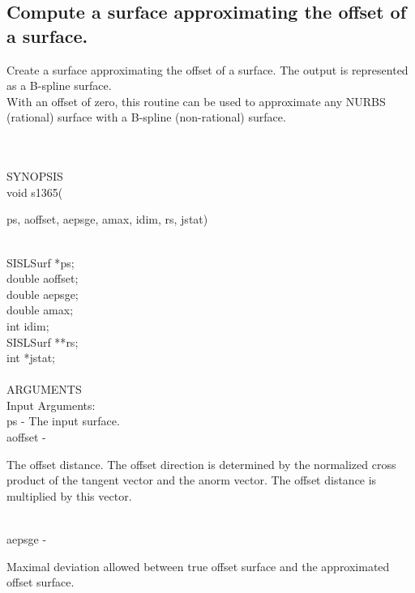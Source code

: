 \subsection{Compute a surface approximating the offset of a surface.}
\begin{minipg1}
  Create a surface approximating the offset of a surface.
  The output is represented as a B-spline surface.\\
  With an offset of zero, this routine can be used to approximate any
  NURBS (rational) surface with a B-spline (non-rational) surface.
\end{minipg1} \\ \\
SYNOPSIS\\
        \>void s1365(\begin{minipg3}
          {\fov ps}, {\fov aoffset}, {\fov aepsge}, {\fov amax}, {\fov idim}, {\fov rs}, {\fov jstat})
        \end{minipg3}\\[0.3ex]
        \>\>    SISLSurf \> *{\fov ps};\\
        \>\>    double   \> {\fov aoffset};\\
        \>\>    double   \> {\fov aepsge};\\
        \>\>    double   \> {\fov amax};\\
        \>\>    int      \> {\fov idim};\\
        \>\>    SISLSurf \> **{\fov rs};\\
        \>\>    int      \> *{\fov jstat};\\
\\
ARGUMENTS\\
        \>Input Arguments:\\
        \>\>    {\fov ps} \> - \> The input surface.\\
        \>\>    {\fov aoffset} \> - \>
        \begin{minipg2}
          The offset distance.
          The offset direction is determined by the normalized cross
          product of the tangent vector and the anorm vector.
          The offset distance is multiplied by this vector.
        \end{minipg2}\\[0.8ex]
        \>\>    {\fov aepsge} \> - \>
        \begin{minipg2}
          Maximal deviation allowed between true offset surface
          and the approximated offset surface.
        \end{minipg2}\\[0.8ex]

